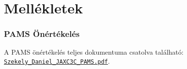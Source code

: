 \appendix
\chapter*{Mellékletek}
\setcounter{chapter}{\appendixnumber}

\subsection*{PAMS Önértékelés}

\noindent
A PAMS önértékelés teljes dokumentuma csatolva található: 
\href{figures/Szekely_Daniel_JAXC3C_PAMS.pdf}{\texttt{Szekely\_Daniel\_JAXC3C\_PAMS.pdf}}.
